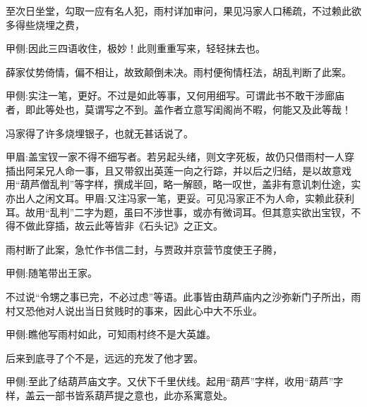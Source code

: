 \begin{parag}
    至次日坐堂，勾取一应有名人犯，雨村详加审问，果见冯家人口稀疏，不过赖此欲多得些烧埋之费，\begin{note}甲侧:因此三四语收住，极妙！此则重重写来，轻轻抹去也。\end{note}薛家仗势倚情，偏不相让，故致颠倒未决。雨村便徇情枉法，胡乱判断了此案。\begin{note}甲侧:实注一笔，更好。不过是如此等事，又何用细写。可谓此书不敢干涉廊庙者，即此等处也，莫谓写之不到。盖作者立意写闺阁尚不暇，何能又及此等哉！\end{note}冯家得了许多烧埋银子，也就无甚话说了。\begin{note}甲眉:盖宝钗一家不得不细写者。若另起头绪，则文字死板，故仍只借雨村一人穿插出阿呆兄人命一事，且又带叙出英莲一向之行踪，并以后之归结，是以故意戏用“葫芦僧乱判”等字样，撰成半回，略一解颐，略一叹世，盖非有意讥刺仕途，实亦出人之闲文耳。甲眉:又注冯家一笔，更妥。可见冯家正不为人命，实赖此获利耳。故用“乱判”二字为题，虽曰不涉世事，或亦有微词耳。但其意实欲出宝钗，不得不做此穿插，故云此等皆非《石头记》之正文。\end{note}雨村断了此案，急忙作书信二封，与贾政并京营节度使王子腾，\begin{note}甲侧:随笔带出王家。\end{note}不过说“令甥之事已完，不必过虑”等语。此事皆由葫芦庙内之沙弥新门子所出，雨村又恐他对人说出当日贫贱时的事来，因此心中大不乐业。\begin{note}甲侧:瞧他写雨村如此，可知雨村终不是大英雄。\end{note}后来到底寻了个不是，远远的充发了他才罢。\begin{note}甲侧:至此了结葫芦庙文字。又伏下千里伏线。起用“葫芦”字样，收用“葫芦”字样，盖云一部书皆系葫芦提之意也，此亦系寓意处。\end{note}
\end{parag}


